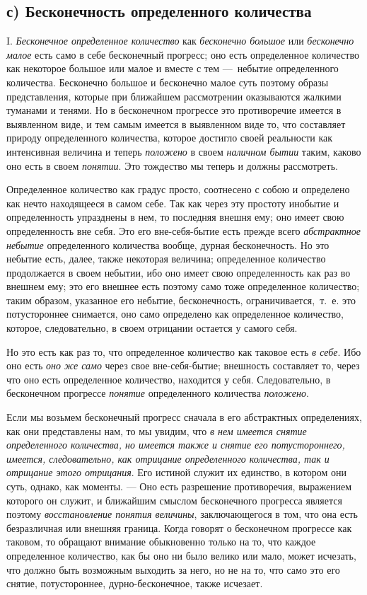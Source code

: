 \subsection[с) Бесконечность определенного количества]{с) Бесконечность определенного количества}
I. {\em Бесконечное определенное количество} как
{\em бесконечно большое} или
{\em бесконечно малое} есть само в себе бесконечный
прогресс; оно есть определенное количество как некоторое большое или малое
и вместе с тем —~небытие определенного количества. Бесконечно большое и
бесконечно малое суть поэтому образы представления, которые при ближайшем
рассмотрении оказываются жалкими туманами и тенями. Но в бесконечном
прогрессе это противоречие имеется в выявленном виде, и тем самым имеется в
выявленном виде то, что составляет природу определенного количества,
которое достигло своей реальности как интенсивная величина и теперь
{\em положено} в своем
{\em наличном бытии} таким, каково оно есть в своем
{\em понятии}. Это тождество мы теперь и должны
рассмотреть.

Определенное количество как градус просто, соотнесено с собою и определено
как нечто находящееся в самом себе. Так как через эту простоту инобытие и
определенность упразднены в нем, то последняя внешня ему; оно имеет свою
определенность вне себя. Это его вне-себя-бытие есть прежде всего
{\em абстрактное небытие} определенного количества
вообще, дурная бесконечность. Но это небытие есть, далее, также некоторая
величина; определенное количество продолжается в своем небытии, ибо оно
имеет свою определенность как раз во внешнем ему; это его внешнее есть
поэтому само тоже определенное количество; таким образом, указанное его
небытие, бесконечность, ограничивается,~т.~е. это потустороннее снимается,
оно само определено как определенное количество, которое, следовательно, в
своем отрицании остается у самого себя.

Но это есть как раз то, что определенное количество как таковое есть
{\em в себе}. Ибо оно есть {\em оно
же само} через свое вне-себя-бытие; внешность составляет то, через что оно
есть определенное количество, находится у себя. Следовательно, в
бесконечном прогрессе {\em понятие} определенного
количества {\em положено}.

Если мы возьмем бесконечный прогресс сначала в его абстрактных
определениях, как они представлены нам, то мы увидим, что
{\em в нем имеется снятие определенного количества, но
имеется также и снятие его потустороннего, имеется, следовательно, как
отрицание определенного количества, так и отрицание этого отрицания}. Его
истиной служит их единство, в котором они суть, однако, как моменты. — Оно
есть разрешение противоречия, выражением которого он служит, и ближайшим
смыслом бесконечного прогресса является поэтому
{\em восстановление понятия величины}, заключающегося в
том, что она есть безразличная или внешняя граница. Когда говорят о
бесконечном прогрессе как таковом, то обращают внимание обыкновенно только
на то, что каждое определенное количество, как бы оно ни было велико или
мало, может исчезать, что должно быть возможным выходить за него, но не на
то, что само это его снятие, потустороннее, дурно-бесконечное, также
исчезает.

